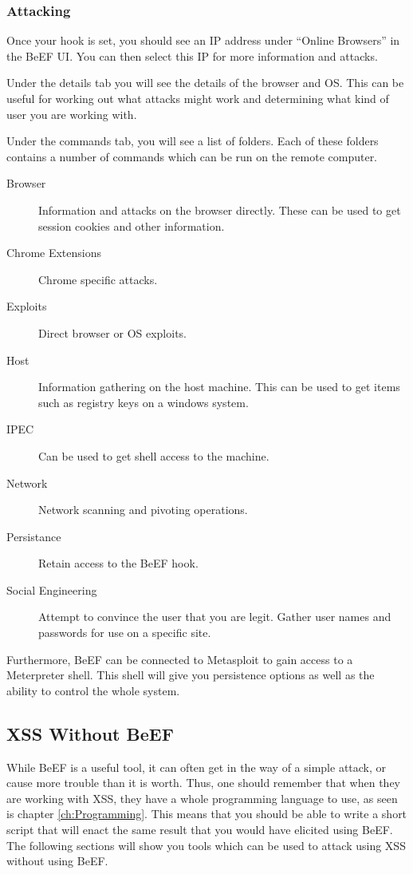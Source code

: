 			\subsubsection{Attacking}
				Once your hook is set, you should see an IP address under ``Online Browsers'' in the BeEF UI.
				You can then select this IP for more information and attacks.

				Under the details tab you will see the details of the browser and OS.
				This can be useful for working out what attacks might work and determining what kind of user you are working with.

				Under the commands tab, you will see a list of folders.
				Each of these folders contains a number of commands which can be run on the remote computer.
				\begin{description}
					\item[Browser] Information and attacks on the browser directly.
						These can be used to get session cookies and other information.
					\item[Chrome Extensions] Chrome specific attacks.
					\item[Exploits] Direct browser or OS exploits.
					\item[Host] Information gathering on the host machine.
						This can be used to get items such as registry keys on a windows system.
					\item[IPEC] Can be used to get shell access to the machine.
					\item[Network] Network scanning and pivoting operations.
					\item[Persistance] Retain access to the BeEF hook.
					\item[Social Engineering] Attempt to convince the user that you are legit.
						Gather user names and passwords for use on a specific site.
				\end{description}

				Furthermore, BeEF can be connected to Metasploit to gain access to a Meterpreter shell.
				This shell will give you persistence options as well as the ability to control the whole system.
		\subsection{XSS Without BeEF}
			While BeEF is a useful tool, it can often get in the way of a simple attack, or cause more trouble than it is worth.
			Thus, one should remember that when they are working with XSS, they have a whole programming language to use, as seen is chapter \ref{ch:Programming}.
			This means that you should be able to write a short script that will enact the same result that you would have elicited using BeEF.
			The following sections will show you tools which can be used to attack using XSS without using BeEF.

